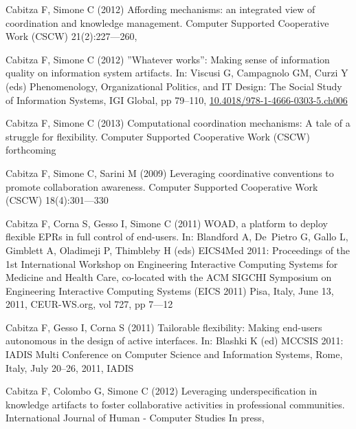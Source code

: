 \documentclass{article}
\begin{document}
\begin{thebibliography}{193}
Cabitza F, Simone C (2012{}) Affording mechanisms: an integrated
  view of coordination and knowledge management. Computer Supported Cooperative
  Work {(CSCW)} 21(2):227---260, 

Cabitza F, Simone C (2012{}) {''Whatever} works'': Making sense of
  information quality on information system artifacts. In: Viscusi G,
  Campagnolo GM, Curzi Y (eds) Phenomenology, Organizational Politics, and {IT}
  Design: The Social Study of Information Systems, {IGI} Global, pp 79--110,
  \urlprefix\url{10.4018/978-1-4666-0303-5.ch006}

Cabitza F, Simone C (2013) Computational coordination mechanisms: A tale of a
  struggle for flexibility. Computer Supported Cooperative Work {(CSCW)}
  forthcoming

Cabitza F, Simone C, Sarini M (2009) Leveraging coordinative conventions to
  promote collaboration awareness. Computer Supported Cooperative Work {(CSCW)}
  18(4):301---330

Cabitza F, Corna S, Gesso I, Simone C (2011{}) {WOAD}, a platform
  to deploy flexible {EPRs} in full control of end-users. In: Blandford A,
  De~Pietro G, Gallo L, Gimblett A, Oladimeji P, Thimbleby H (eds) {EICS4Med}
  2011: Proceedings of the 1st International Workshop on Engineering
  Interactive Computing Systems for Medicine and Health Care, co-located with
  the {ACM} {SIGCHI} Symposium on Engineering Interactive Computing Systems
  {(EICS} 2011) Pisa, Italy, June 13, 2011, {CEUR-WS.org}, vol 727, pp 7---12

Cabitza F, Gesso I, Corna S (2011{}) Tailorable flexibility: Making
  end-users autonomous in the design of active interfaces. In: Blashki K (ed)
  {MCCSIS} 2011: {IADIS} Multi Conference on Computer Science and Information
  Systems, Rome, Italy, July 20--26, 2011, {IADIS}

Cabitza F, Colombo G, Simone C (2012{}) Leveraging
  underspecification in knowledge artifacts to foster collaborative activities
  in professional communities. International Journal of Human - Computer
  Studies In press, 


\end{thebibliography}
\end{document}
